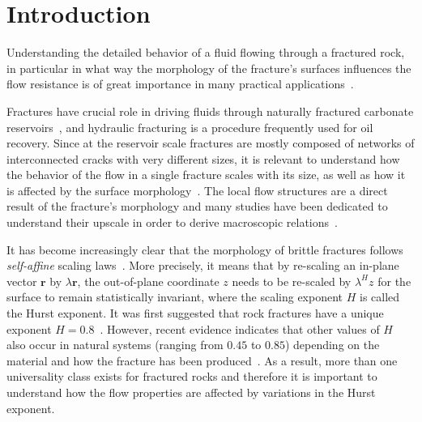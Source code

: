 \documentclass[aps,pre,
superscriptaddress,
twocolumn,
notitlepage,
10pt,
]{revtex4-1}
\begin{document}
\maketitle

\section{Introduction}


Understanding the detailed behavior of a fluid flowing through a fractured rock,
in particular in what way the morphology of the fracture's surfaces influences
the flow resistance is of great importance in many practical
applications~\cite{Sahimi1993, Berkowitz2002, Sahimi2011, Osborn2011,
	Williams2017}.

Fractures have crucial role in driving fluids through naturally fractured
carbonate reservoirs~\cite{Warren1963, Liu2016a}, and hydraulic fracturing
\cite{HUBBERT1957, Rubinstein2015} is a procedure frequently used for oil
recovery. Since at the reservoir scale fractures are mostly composed of networks
of interconnected cracks with very different sizes, it is relevant to understand
how the behavior of the flow in a single fracture scales with its size, as well
as how it is affected by the surface morphology~\cite{Liu2016a}. The local flow
structures are a direct result of the fracture's morphology and many studies
have been dedicated to understand their upscale in order to derive macroscopic
relations~\cite{Roux1993, Talon2010, Talon2010a, Wang2016}.


It has become increasingly clear that the morphology of brittle fractures
follows \emph{self-affine} scaling laws~\cite{Bunde1996}. More precisely, it
means that by re-scaling an in-plane vector $\mathbf{r}$ by $\lambda
\mathbf{r}$, the out-of-plane coordinate $z$ needs to be re-scaled by
$\lambda^{H} z$ for the surface to remain statistically invariant, where the
scaling exponent $H$ is called the Hurst exponent. 
%
It was first suggested that rock fractures have a unique exponent
$H=0.8$~\cite{Bouchaud1990, Maaloey1992, Schmittbuhl1993,
	Cox1993,Schmittbuhl1995,Bouchaud1997, Oron1998}. However, recent evidence
indicates that other values of $H$ also occur in natural systems (ranging from
$0.45$ to $0.85$) depending  on the material and how the fracture has been
produced~\cite{Odling1994,Amitrano2002, Ponson2006, Babadagli2015}. As a result,
more than one universality class exists for fractured rocks and therefore it is
important to understand how the flow properties are affected by variations in
the Hurst exponent.
\end{document}
